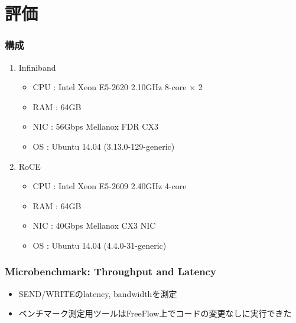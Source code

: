 \documentclass[dvipdfmx,9pt,notheorems]{beamer}
\theoremstyle{definition}
\begin{document}
\section{評価}
\begin{frame}\frametitle{構成}
	\begin{enumerate}
		\item Infiniband
		\begin{itemize}
			\item CPU : Intel Xeon E5-2620 2.10GHz 8-core $\times$ 2
			\item RAM : 64GB
			\item NIC : 56Gbps Mellanox FDR CX3
			\item OS  : Ubuntu 14.04 (3.13.0-129-generic)
		\end{itemize}
		\item RoCE
		\begin{itemize}
			\item CPU : Intel Xeon E5-2609 2.40GHz 4-core
			\item RAM : 64GB
			\item NIC : 40Gbps Mellanox CX3 NIC
			\item OS  : Ubuntu 14.04 (4.4.0-31-generic)
		\end{itemize}
	\end{enumerate}
\end{frame}

\begin{frame}\frametitle{Microbenchmark: Throughput and Latency}
	\begin{itemize}
		\item SEND/WRITEのlatency, bandwidthを測定
		\item ベンチマーク測定用ツールはFreeFlow上で{\color{orange}コードの変更なしに実行できた}
	\end{itemize}
\end{frame}
\end{document}
